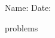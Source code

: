 





\begin{{document}}

Name:\underline{{\hspace*{{4cm}}}}
Date:\underline{{\hspace*{{4cm}}}} \hfill

\vspace{{1cm}}
{problems}

\end{{document}}
